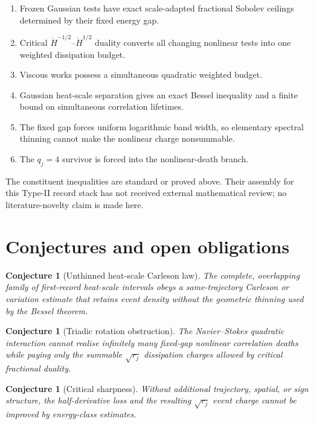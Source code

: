 \documentclass[11pt]{article}
\newtheorem{conjecture}[theorem]{Conjecture}
\theoremstyle{remark}
\begin{document}
\begin{enumerate}
\item Frozen Gaussian tests have exact scale-adapted fractional Sobolev
ceilings determined by their fixed energy gap.
\item Critical \(\dot H^{-1/2}\)--\(\dot H^{1/2}\) duality converts all
changing nonlinear tests into one weighted dissipation budget.
\item Viscous works possess a simultaneous quadratic weighted budget.
\item Gaussian heat-scale separation gives an exact Bessel inequality and a
finite bound on simultaneous correlation lifetimes.
\item The fixed gap forces uniform logarithmic band width, so elementary
spectral thinning cannot make the nonlinear charge nonsummable.
\item The \(q_j=4\) survivor is forced into the nonlinear-death branch.
\end{enumerate}

The constituent inequalities are standard or proved above.  Their assembly
for this Type-II record stack has not received external mathematical review;
no literature-novelty claim is made here.

\section{Conjectures and open obligations}

\begin{conjecture}[Unthinned heat-scale Carleson law]
The complete, overlapping family of first-record heat-scale intervals obeys
a same-trajectory Carleson or variation estimate that retains event density
without the geometric thinning used by the Bessel theorem.
\end{conjecture}

\begin{conjecture}[Triadic rotation obstruction]
The Navier--Stokes quadratic interaction cannot realise infinitely many
fixed-gap nonlinear correlation deaths while paying only the summable
\(\sqrt{r_j}\) dissipation charges allowed by critical fractional duality.
\end{conjecture}

\begin{conjecture}[Critical sharpness]
Without additional trajectory, spatial, or sign structure, the
half-derivative loss and the resulting \(\sqrt{r_j}\) event charge cannot be
improved by energy-class estimates.
\end{conjecture}
\end{document}
